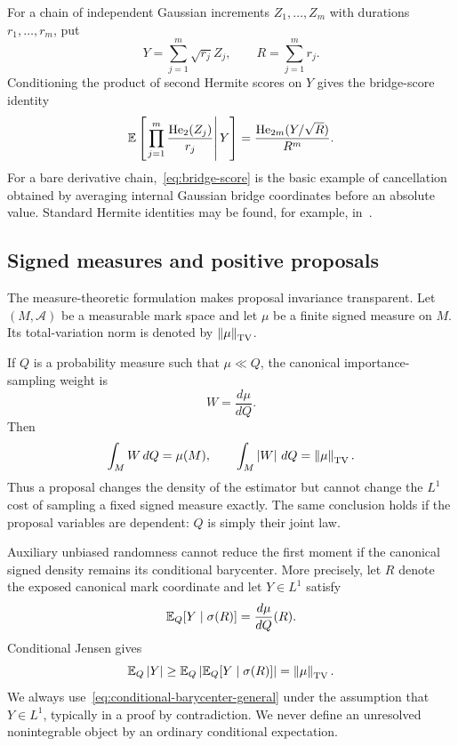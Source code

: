 For a chain of independent Gaussian increments $Z_1,\ldots,Z_m$ with durations $r_1,\ldots,r_m$, put
\begin{equation*}
  Y=\sum_{j=1}^m\sqrt{r_j}Z_j,
  \qquad
  R=\sum_{j=1}^m r_j.
\end{equation*}
Conditioning the product of second Hermite scores on $Y$ gives the bridge-score identity
\begin{equation}
  \mathbb E\left[
    \left.
    \prod_{j=1}^m\frac{\operatorname{He}_2(Z_j)}{r_j}
    \right|Y
  \right]
  =
  \frac{\operatorname{He}_{2m}(Y/\sqrt R)}{R^m}.
  \label{eq:bridge-score}
\end{equation}
For a bare derivative chain,~\eqref{eq:bridge-score} is the basic example of cancellation obtained by averaging internal Gaussian bridge coordinates before an absolute value. Standard Hermite identities may be found, for example, in~\cite{Janson1997}.

\subsection{Signed measures and positive proposals}

The measure-theoretic formulation makes proposal invariance transparent. Let $(M,\mathcal A)$ be a measurable mark space and let $\mu$ be a finite signed measure on $M$. Its total-variation norm is denoted by $\left\lVert\mu\right\rVert_{\mathrm{TV}}$.

If $Q$ is a probability measure such that $\mu\ll Q$, the canonical importance-sampling weight is
\begin{equation*}
  W=\frac{d\mu}{dQ}.
\end{equation*}
Then
\begin{equation}
  \int_M W\,dQ
  =
  \mu(M),
  \qquad
  \int_M\left|W\right|\,dQ
  =
  \left\lVert\mu\right\rVert_{\mathrm{TV}}.
  \label{eq:proposal-tv}
\end{equation}
Thus a proposal changes the density of the estimator but cannot change the $L^1$ cost of sampling a fixed signed measure exactly. The same conclusion holds if the proposal variables are dependent: $Q$ is simply their joint law.

Auxiliary unbiased randomness cannot reduce the first moment if the canonical signed density remains its conditional barycenter. More precisely, let $R$ denote the exposed canonical mark coordinate and let $Y\in L^1$ satisfy
\begin{equation}
  \mathbb E_Q[Y\mid\sigma(R)]
  =
  \frac{d\mu}{dQ}(R).
  \label{eq:conditional-barycenter-general}
\end{equation}
Conditional Jensen gives
\begin{equation}
  \mathbb E_Q\left|Y\right|
  \geq
  \mathbb E_Q\left|\mathbb E_Q[Y\mid\sigma(R)]\right|
  =
  \left\lVert\mu\right\rVert_{\mathrm{TV}}.
  \label{eq:conditional-jensen-tv}
\end{equation}
We always use~\eqref{eq:conditional-barycenter-general} under the assumption that $Y\in L^1$, typically in a proof by contradiction. We never define an unresolved nonintegrable object by an ordinary conditional expectation.

